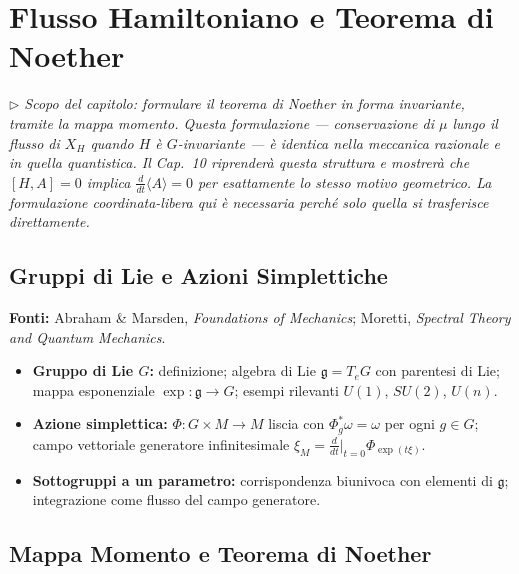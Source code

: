 \documentclass[12pt, a4paper]{article}
\newcommand{\fonti}[1]{%
	\begin{fontebox}
		\textcolor{fontecolor}{\footnotesize\textbf{Fonti:} #1}
	\end{fontebox}%
}
\newcommand{\nota}[1]{%
	\par\smallskip
	\noindent\textit{\small $\triangleright$\; #1}
	\par\smallskip
}
\begin{document}
	\newpage
	\section{Flusso Hamiltoniano e Teorema di Noether}
	
	\nota{Scopo del capitolo: formulare il teorema di Noether in forma invariante, tramite
		la mappa momento. Questa formulazione --- conservazione di $\mu$ lungo il flusso di
		$X_H$ quando $H$ è $G$-invariante --- è identica nella meccanica razionale e in quella
		quantistica. Il Cap.\ 10 riprenderà questa struttura e mostrerà che $[H, A] = 0$
		implica $\frac{d}{dt}\langle A \rangle = 0$ per esattamente lo stesso motivo geometrico.
		La formulazione coordinata-libera qui è necessaria perché solo quella si trasferisce
		direttamente.}
	
	\subsection{Gruppi di Lie e Azioni Simplettiche}
	
	\fonti{Abraham \& Marsden, \textit{Foundations of Mechanics}; Moretti,
		\textit{Spectral Theory and Quantum Mechanics}.}
	
	\begin{itemize}
		\item \textbf{Gruppo di Lie $G$:} definizione; algebra di Lie $\mathfrak{g} = T_eG$
		con parentesi di Lie; mappa esponenziale $\exp: \mathfrak{g} \to G$; esempi
		rilevanti $U(1)$, $SU(2)$, $U(n)$.
		\item \textbf{Azione simplettica:} $\Phi: G \times M \to M$ liscia con
		$\Phi_g^* \omega = \omega$ per ogni $g \in G$; campo vettoriale generatore
		infinitesimale $\xi_M = \frac{d}{dt}\big|_{t=0} \Phi_{\exp(t\xi)}$.
		\item \textbf{Sottogruppi a un parametro:} corrispondenza biunivoca con elementi
		di $\mathfrak{g}$; integrazione come flusso del campo generatore.
	\end{itemize}
	
	\subsection{Mappa Momento e Teorema di Noether}
	
\end{document}

